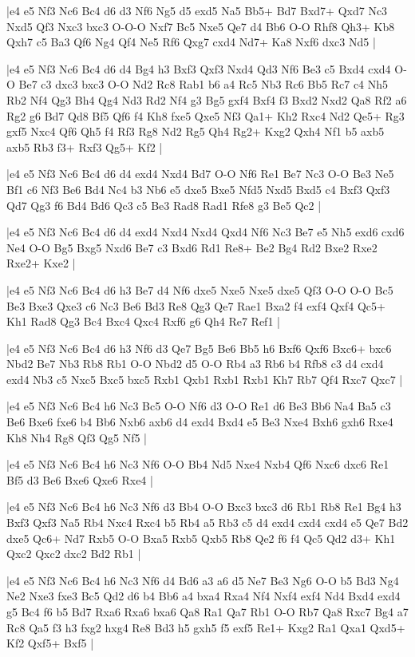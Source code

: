 \whitename{}
\blackname{}
\makegametitle
|e4 e5 Nf3 Nc6 Bc4 d6 d3 Nf6 Ng5 d5 exd5 Na5 Bb5+ Bd7 Bxd7+ Qxd7 Nc3 Nxd5 Qf3 Nxc3 bxc3 O-O-O Nxf7 Bc5 Nxe5 Qe7 d4 Bb6 O-O Rhf8 Qh3+ Kb8 Qxh7 c5 Ba3 Qf6 Ng4 Qf4 Ne5 Rf6 Qxg7 cxd4 Nd7+ Ka8 Nxf6 dxc3 Nd5  |

\whitename{}
\blackname{}
\makegametitle
|e4 e5 Nf3 Nc6 Bc4 d6 d4 Bg4 h3 Bxf3 Qxf3 Nxd4 Qd3 Nf6 Be3 c5 Bxd4 cxd4 O-O Be7 c3 dxc3 bxc3 O-O Nd2 Rc8 Rab1 b6 a4 Rc5 Nb3 Rc6 Bb5 Rc7 c4 Nh5 Rb2 Nf4 Qg3 Bh4 Qg4 Nd3 Rd2 Nf4 g3 Bg5 gxf4 Bxf4 f3 Bxd2 Nxd2 Qa8 Rf2 a6 Rg2 g6 Bd7 Qd8 Bf5 Qf6 f4 Kh8 fxe5 Qxe5 Nf3 Qa1+ Kh2 Rxc4 Nd2 Qe5+ Rg3 gxf5 Nxc4 Qf6 Qh5 f4 Rf3 Rg8 Nd2 Rg5 Qh4 Rg2+ Kxg2 Qxh4 Nf1 b5 axb5 axb5 Rb3 f3+ Rxf3 Qg5+ Kf2  |

\whitename{}
\blackname{}
\makegametitle
|e4 e5 Nf3 Nc6 Bc4 d6 d4 exd4 Nxd4 Bd7 O-O Nf6 Re1 Be7 Nc3 O-O Be3 Ne5 Bf1 c6 Nf3 Be6 Bd4 Nc4 b3 Nb6 e5 dxe5 Bxe5 Nfd5 Nxd5 Bxd5 c4 Bxf3 Qxf3 Qd7 Qg3 f6 Bd4 Bd6 Qc3 c5 Be3 Rad8 Rad1 Rfe8 g3 Be5 Qc2  |

\whitename{}
\blackname{}
\makegametitle
|e4 e5 Nf3 Nc6 Bc4 d6 d4 exd4 Nxd4 Nxd4 Qxd4 Nf6 Nc3 Be7 e5 Nh5 exd6 cxd6 Ne4 O-O Bg5 Bxg5 Nxd6 Be7 c3 Bxd6 Rd1 Re8+ Be2 Bg4 Rd2 Bxe2 Rxe2 Rxe2+ Kxe2  |

\whitename{}
\blackname{}
\makegametitle
|e4 e5 Nf3 Nc6 Bc4 d6 h3 Be7 d4 Nf6 dxe5 Nxe5 Nxe5 dxe5 Qf3 O-O O-O Bc5 Be3 Bxe3 Qxe3 c6 Nc3 Be6 Bd3 Re8 Qg3 Qe7 Rae1 Bxa2 f4 exf4 Qxf4 Qc5+ Kh1 Rad8 Qg3 Bc4 Bxc4 Qxc4 Rxf6 g6 Qh4 Re7 Ref1  |

\whitename{}
\blackname{}
\makegametitle
|e4 e5 Nf3 Nc6 Bc4 d6 h3 Nf6 d3 Qe7 Bg5 Be6 Bb5 h6 Bxf6 Qxf6 Bxc6+ bxc6 Nbd2 Be7 Nb3 Rb8 Rb1 O-O Nbd2 d5 O-O Rb4 a3 Rb6 b4 Rfb8 c3 d4 cxd4 exd4 Nb3 c5 Nxc5 Bxc5 bxc5 Rxb1 Qxb1 Rxb1 Rxb1 Kh7 Rb7 Qf4 Rxc7 Qxc7  |

\whitename{}
\blackname{}
\makegametitle
|e4 e5 Nf3 Nc6 Bc4 h6 Nc3 Bc5 O-O Nf6 d3 O-O Re1 d6 Be3 Bb6 Na4 Ba5 c3 Be6 Bxe6 fxe6 b4 Bb6 Nxb6 axb6 d4 exd4 Bxd4 e5 Be3 Nxe4 Bxh6 gxh6 Rxe4 Kh8 Nh4 Rg8 Qf3 Qg5 Nf5  |

\whitename{}
\blackname{}
\makegametitle
|e4 e5 Nf3 Nc6 Bc4 h6 Nc3 Nf6 O-O Bb4 Nd5 Nxe4 Nxb4 Qf6 Nxc6 dxc6 Re1 Bf5 d3 Be6 Bxe6 Qxe6 Rxe4  |

\whitename{}
\blackname{}
\makegametitle
|e4 e5 Nf3 Nc6 Bc4 h6 Nc3 Nf6 d3 Bb4 O-O Bxc3 bxc3 d6 Rb1 Rb8 Re1 Bg4 h3 Bxf3 Qxf3 Na5 Rb4 Nxc4 Rxc4 b5 Rb4 a5 Rb3 c5 d4 exd4 cxd4 cxd4 e5 Qe7 Bd2 dxe5 Qc6+ Nd7 Rxb5 O-O Bxa5 Rxb5 Qxb5 Rb8 Qe2 f6 f4 Qc5 Qd2 d3+ Kh1 Qxc2 Qxc2 dxc2 Bd2 Rb1  |

\whitename{}
\blackname{}
\makegametitle
|e4 e5 Nf3 Nc6 Bc4 h6 Nc3 Nf6 d4 Bd6 a3 a6 d5 Ne7 Be3 Ng6 O-O b5 Bd3 Ng4 Ne2 Nxe3 fxe3 Bc5 Qd2 d6 b4 Bb6 a4 bxa4 Rxa4 Nf4 Nxf4 exf4 Nd4 Bxd4 exd4 g5 Bc4 f6 b5 Bd7 Rxa6 Rxa6 bxa6 Qa8 Ra1 Qa7 Rb1 O-O Rb7 Qa8 Rxc7 Bg4 a7 Rc8 Qa5 f3 h3 fxg2 hxg4 Re8 Bd3 h5 gxh5 f5 exf5 Re1+ Kxg2 Ra1 Qxa1 Qxd5+ Kf2 Qxf5+ Bxf5  |

